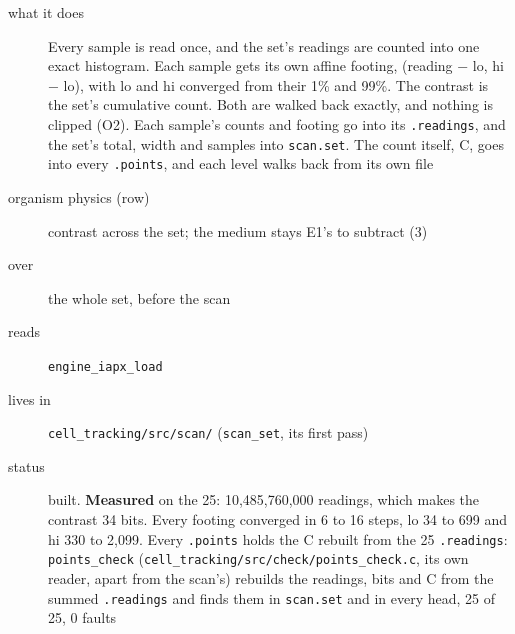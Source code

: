 \begin{description}
\item[{what it does}] Every sample is read once, and the set's readings are counted into one exact histogram. Each sample gets its own affine footing, (reading − lo, hi − lo), with lo and hi converged from their 1\% and 99\%. The contrast is the set's cumulative count. Both are walked back exactly, and nothing is clipped (O2). Each sample's counts and footing go into its \texttt{.\allowbreak{}readings}, and the set's total, width and samples into \texttt{scan.\allowbreak{}set}. The count itself, C, goes into every \texttt{.\allowbreak{}points}, and each level walks back from its own file
\item[{organism physics (row)}] contrast across the set; the medium stays E1's to subtract (3)
\item[{over}] the whole set, before the scan
\item[{reads}] \texttt{engine\_\allowbreak{}iapx\_\allowbreak{}load}
\item[{lives in}] \texttt{cell\_\allowbreak{}tracking/\allowbreak{}src/\allowbreak{}scan/\allowbreak{}} (\texttt{scan\_\allowbreak{}set}, its first pass)
\item[{status}] built. \textbf{Measured} on the 25: 10,485,760,000 readings, which makes the contrast 34 bits. Every footing converged in 6 to 16 steps, lo 34 to 699 and hi 330 to 2,099. Every \texttt{.\allowbreak{}points} holds the C rebuilt from the 25 \texttt{.\allowbreak{}readings}: \texttt{points\_\allowbreak{}check} (\texttt{cell\_\allowbreak{}tracking/\allowbreak{}src/\allowbreak{}check/\allowbreak{}points\_\allowbreak{}check.\allowbreak{}c}, its own reader, apart from the scan's) rebuilds the readings, bits and C from the summed \texttt{.\allowbreak{}readings} and finds them in \texttt{scan.\allowbreak{}set} and in every head, 25 of 25, 0 faults
\end{description}

